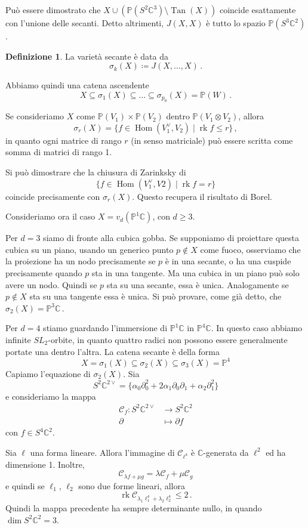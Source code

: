 \documentclass[a4paper, 11pt]{article}
\theoremstyle{definition}
\newtheorem{Def}{Definizione}[section]
\theoremstyle{plain}
\newcommand{\PP}{\mathbb{P}}
\newcommand{\C}{\mathbb{C}}
\newcommand{\deff}{\coloneqq}
\newcommand{\CC}{\mathcal{C}}
\DeclareMathOperator{\Hom}{Hom}
\DeclareMathOperator{\Tan}{Tan}
\DeclareMathOperator{\rk}{rk}
\begin{document}
Può essere dimostrato che $X \cup (\PP(S^2\C^3)\setminus \Tan(X))$ coincide esattamente con l'unione delle secanti. Detto altrimenti, $J(X,X)$ è tutto lo spazio $\PP(S^3\C^2)$.

\begin{Def}
	La varietà secante è data da 
	\[
		\sigma_k(X) \deff J(X, \dots, X)\,.
	\]
\end{Def}
Abbiamo quindi una catena ascendente
\[
	X \subseteq \sigma_1(X) \subseteq \dots \subseteq \sigma_{p_0}(X) = \PP(W)\,.
\]

Se consideriamo $X$ come $\PP(V_1) \times \PP(V_2)$ dentro $\PP(V_1 \otimes V_2)$, allora
\[
	\sigma_r(X) = \{f \in \Hom(V_1^{\vee}, V_2) \mid \rk f \le r\}\,,
\]
in quanto ogni matrice di rango $r$ (in senso matriciale) può essere scritta come somma di matrici di rango 1.

Si può dimostrare che la chiusura di Zarinksky di 
\[
	\{f \in \Hom(V_1^\vee, V2) \mid \rk f = r\}
\]
coincide precisamente con $\sigma_r(X)$. Questo recupera il risultato di Borel.

Consideriamo ora il caso $X = v_d(\PP^1\C)$, con $d \ge 3$.

Per $d = 3$ siamo di fronte alla cubica gobba. Se supponiamo di proiettare questa cubica su un piano, usando un generico punto $p \notin X$ come fuoco, osserviamo che la proiezione ha un nodo precisamente se $p$ è in una secante, o ha una cuspide precisamente quando $p$ sta in una tangente. Ma una cubica in un piano può solo avere un nodo. Quindi se $p$ sta su una secante, essa è unica. Analogamente se $p \notin X$ sta su una tangente essa è unica. Si può provare, come già detto, che $\sigma_2(X) = \PP^3\C$\,.

Per $d = 4$ stiamo guardando l'immersione di $\PP^1\C$ in $\PP^4\C$. In questo caso abbiamo infinite $SL_2$-orbite, in quanto quattro radici non possono essere generalmente portate una dentro l'altra. La catena secante è della forma
\[
	X = \sigma_1(X) \subseteq \sigma_2(X) \subseteq \sigma_3(X) = \PP^4
\]
Capiamo l'equazione di $\sigma_2(X)$. Sia
\[
	S^2\C^{2\vee} = \{\alpha_0\partial_0^2 + 2 \alpha_1\partial_0\partial_1 + \alpha_2\partial_1^2\}
\]
e consideriamo la mappa
\[
\begin{split}
	\CC_f \colon S^2\C^{2\vee} &\to S^2\C^2 \\
	\partial &\mapsto \partial f
\end{split}
\]	
con $f \in S^4\C^2$.

Sia $\ell$ una forma lineare. Allora l'immagine di $\CC_{\ell^4}$ è $\C$-generata da $\ell^2$ ed ha dimensione 1. Inoltre,
\[
	\CC_{\lambda f + \mu g} = \lambda \CC_f + \mu \CC_g
\]
e quindi se $\ell_1$, $\ell_2$ sono due forme lineari, allora
\[
	\rk \CC_{\lambda_1 \ell_1^4 + \lambda_2 \ell_2^4} \le 2\,.
\]
Quindi la mappa precedente ha sempre determinante nullo, in quando $\dim S^2\C^2 = 3$.
\end{document}
